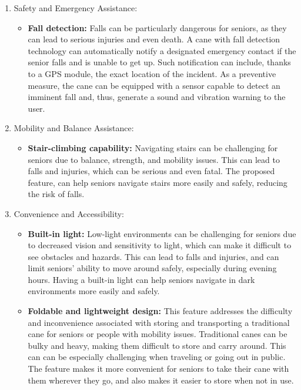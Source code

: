 \documentclass[12pt, twoside]{report}
\begin{document}
\begin{enumerate}
    \item Safety and Emergency Assistance:
    \begin{itemize}
        \item \textbf{Fall detection:} Falls can be particularly dangerous for seniors, as they can lead to serious injuries and even death. A cane with fall detection technology can automatically notify a designated emergency contact if the senior falls and is unable to get up. Such notification can include, thanks to a GPS module, the exact location of the incident. As a preventive measure, the cane can be equipped with a sensor capable to detect an imminent fall and, thus, generate a sound and vibration warning to the user.
    \end{itemize}

    \item Mobility and Balance Assistance:
    \begin{itemize}
        \item \textbf{Stair-climbing capability:} Navigating stairs can be challenging for seniors due to balance, strength, and mobility issues. This can lead to falls and injuries, which can be serious and even fatal. The proposed feature, can help seniors navigate stairs more easily and safely, reducing the risk of falls.
    \end{itemize}

    \item Convenience and Accessibility:
    \begin{itemize}
        \item \textbf{Built-in light:} Low-light environments can be challenging for seniors due to decreased vision and sensitivity to light, which can make it difficult to see obstacles and hazards. This can lead to falls and injuries, and can limit seniors' ability to move around safely, especially during evening hours. Having a built-in light can help seniors navigate in dark environments more easily and safely.
        \item \textbf{Foldable and lightweight design:} This feature addresses the difficulty and inconvenience associated with storing and transporting a traditional cane for seniors or people with mobility issues. Traditional canes can be bulky and heavy, making them difficult to store and carry around. This can can be especially challenging when traveling or going out in public. The feature makes it more convenient for seniors to take their cane with them wherever they go, and also makes it easier to store when not in use.
    \end{itemize}


\end{enumerate}
\end{document}
